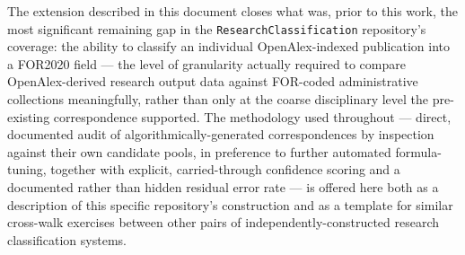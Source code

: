 \documentclass[11pt]{article}
\begin{document}
The extension described in this document closes what was, prior to this work, the most
significant remaining gap in the \texttt{ResearchClassification} repository's coverage:
the ability to classify an individual OpenAlex-indexed publication into a FOR2020 field
--- the level of granularity actually required to compare OpenAlex-derived research
output data against FOR-coded administrative collections meaningfully, rather than only
at the coarse disciplinary level the pre-existing correspondence supported. The
methodology used throughout --- direct, documented audit of algorithmically-generated
correspondences by inspection against their own candidate pools, in preference to
further automated formula-tuning, together with explicit, carried-through confidence
scoring and a documented rather than hidden residual error rate --- is offered here both
as a description of this specific repository's construction and as a template for
similar cross-walk exercises between other pairs of independently-constructed research
classification systems.
\end{document}
